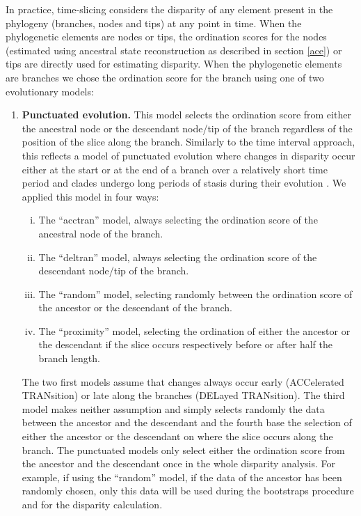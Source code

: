 \documentclass[12pt,a4paper]{article}
\begin{document}
In practice, time-slicing considers the disparity of any element present in the phylogeny (branches, nodes and tips) at any point in time.
When the phylogenetic elements are nodes or tips, the ordination scores for the nodes (estimated using ancestral state reconstruction as described in section \ref{ace}) or tips are directly used for estimating disparity.
When the phylogenetic elements are branches we chose the ordination score for the branch using one of two evolutionary models:



\begin{enumerate}

    \item{\textbf{Punctuated evolution.}} 
    This model selects the ordination score from either the ancestral node or the descendant node/tip of the branch regardless of the position of the slice along the branch. 
    Similarly to the time interval approach, this reflects a model of punctuated evolution where changes in disparity occur either at the start or at the end of a branch over a relatively short time period and clades undergo long periods of stasis during their evolution \citep{Gould1977,Hunt20112007}.
    We applied this model in four ways: 

    \begin{enumerate}[(i)]

      \item The ``acctran'' model, always selecting the ordination score of the ancestral node of the branch.
      \item The ``deltran'' model, always selecting the ordination score of the descendant node/tip of the branch.
      \item The ``random'' model, selecting randomly between the ordination score of the ancestor or the descendant of the branch.
      \item The ``proximity'' model, selecting the ordination of either the ancestor or the descendant if the slice occurs respectively before or after half the branch length.

    \end{enumerate}

    The two first models assume that changes always occur early (ACCelerated TRANsition) or late along the branches (DELayed TRANsition).
    The third model makes neither assumption and simply selects randomly the data between the ancestor and the descendant and the fourth base the selection of either the ancestor or the descendant on where the slice occurs along the branch.
    The punctuated models only select either the ordination score from the ancestor and the descendant once in the whole disparity analysis.
    For example, if using the ``random'' model, if the data of the ancestor has been randomly chosen, only this data will be used during the bootstraps procedure and for the disparity calculation.
    

\end{enumerate}
\end{document}

